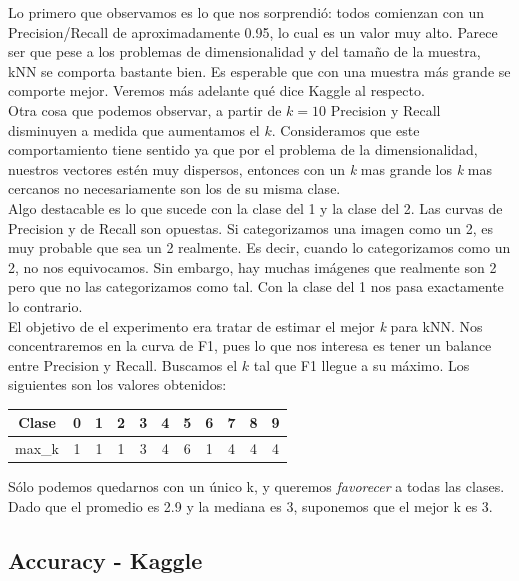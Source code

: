 Lo primero que observamos es lo que nos sorprendió: todos comienzan con un Precision/Recall de aproximadamente 0.95, lo cual es un valor muy alto. Parece ser que pese a los problemas de dimensionalidad y del tamaño de la muestra, kNN se comporta bastante bien. Es esperable que con una muestra más grande se comporte mejor. Veremos más adelante qué dice Kaggle al respecto.\\

Otra cosa que podemos observar, a partir de $k = 10$ Precision y Recall disminuyen a medida que aumentamos el $k$. Consideramos que este comportamiento tiene sentido ya que por el problema de la dimensionalidad, nuestros vectores estén muy dispersos, entonces con un \textit{k} mas grande los \textit{k} mas cercanos no necesariamente son los de su misma clase. \\

Algo destacable es lo que sucede con la clase del 1 y la clase del 2. Las curvas de Precision y de Recall son opuestas. Si categorizamos una imagen como un 2, es muy probable que sea un 2 realmente. Es decir, cuando lo categorizamos como un 2, no nos equivocamos. Sin embargo, hay muchas imágenes que realmente son 2 pero que no las categorizamos como tal. Con la clase del 1 nos pasa exactamente lo contrario. \\

El objetivo de el experimento era tratar de estimar el mejor \textit{k} para kNN. Nos concentraremos en la curva de F1, pues lo que nos interesa es tener un balance entre Precision y Recall. Buscamos el $k$ tal que F1 llegue a su máximo. Los siguientes son los valores obtenidos: \\

\begin{center}
    \begin{tabular}{| c | c | c | c | c | c | c | c | c | c | c |}
    \hline
    Clase   & 0 & 1 & 2 & 3 & 4 & 5 & 6 & 7 & 8 & 9  \\ \hline
    max_k       & 1 & 1 & 1 & 3 & 4 & 6 & 1 & 4 & 4 & 4  \\ \hline
    \end{tabular}
\end{center}

Sólo podemos quedarnos con un único k, y queremos \textit{favorecer} a todas las clases. Dado que el promedio es 2.9 y la mediana es 3, suponemos que el mejor k es 3.



\newpage
\subsection{Accuracy - Kaggle}

